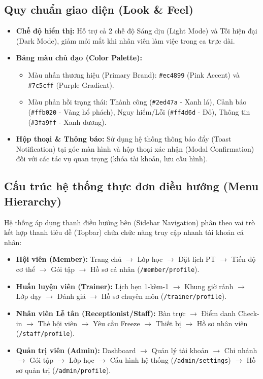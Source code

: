 \documentclass[12pt,a4paper]{report}
\begin{document}
\subsection{Quy chuẩn giao diện (Look \& Feel)}
\begin{itemize}
    \item \textbf{Chế độ hiển thị:} Hỗ trợ cả 2 chế độ Sáng dịu (Light Mode) và Tối hiện đại (Dark Mode), giảm mỏi mắt khi nhân viên làm việc trong ca trực dài.
    \item \textbf{Bảng màu chủ đạo (Color Palette):}
    \begin{itemize}
        \item Màu nhấn thương hiệu (Primary Brand): \texttt{\#ec4899} (Pink Accent) và \texttt{\#7c5cff} (Purple Gradient).
        \item Màu phản hồi trạng thái: Thành công (\texttt{\#2ed47a} - Xanh lá), Cảnh báo (\texttt{\#ffb020} - Vàng hổ phách), Nguy hiểm/Lỗi (\texttt{\#ff4d6d} - Đỏ), Thông tin (\texttt{\#3fa9ff} - Xanh dương).
    \end{itemize}
    \item \textbf{Hộp thoại \& Thông báo:} Sử dụng hệ thống thông báo đẩy (Toast Notification) tại góc màn hình và hộp thoại xác nhận (Modal Confirmation) đối với các tác vụ quan trọng (khóa tài khoản, lưu cấu hình).
\end{itemize}

\subsection{Cấu trúc hệ thống thực đơn điều hướng (Menu Hierarchy)}
Hệ thống áp dụng thanh điều hướng bên (Sidebar Navigation) phân theo vai trò kết hợp thanh tiêu đề (Topbar) chứa chức năng truy cập nhanh tài khoản cá nhân:
\begin{itemize}
    \item \textbf{Hội viên (Member):} Trang chủ $\rightarrow$ Lớp học $\rightarrow$ Đặt lịch PT $\rightarrow$ Tiến độ cơ thể $\rightarrow$ Gói tập $\rightarrow$ Hồ sơ cá nhân (\texttt{/member/profile}).
    \item \textbf{Huấn luyện viên (Trainer):} Lịch hẹn 1-kèm-1 $\rightarrow$ Khung giờ rảnh $\rightarrow$ Lớp dạy $\rightarrow$ Đánh giá $\rightarrow$ Hồ sơ chuyên môn (\texttt{/trainer/profile}).
    \item \textbf{Nhân viên Lễ tân (Receptionist/Staff):} Bàn trực $\rightarrow$ Điểm danh Check-in $\rightarrow$ Thẻ hội viên $\rightarrow$ Yêu cầu Freeze $\rightarrow$ Thiết bị $\rightarrow$ Hồ sơ nhân viên (\texttt{/staff/profile}).
    \item \textbf{Quản trị viên (Admin):} Dashboard $\rightarrow$ Quản lý tài khoản $\rightarrow$ Chi nhánh $\rightarrow$ Gói tập $\rightarrow$ Lớp học $\rightarrow$ Cấu hình hệ thống (\texttt{/admin/settings}) $\rightarrow$ Hồ sơ quản trị (\texttt{/admin/profile}).
\end{itemize}
\end{document}
